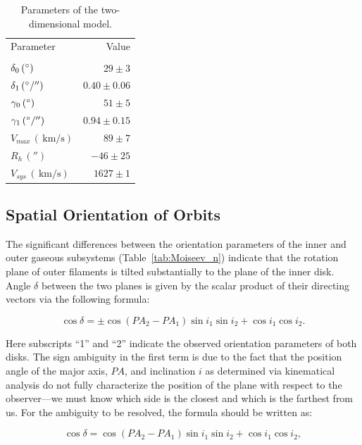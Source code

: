 \documentclass{ab}
\def\degr{\hbox{$^\circ$}}
\newcommand{\km}{\,\mbox{km/s}}
\begin{document}
\begin{table}[tbp]
\caption{Parameters of the two-dimensional model.} \label{tab2:Moiseev_n}
\bigskip
\begin{tabular}{lr}\hline\hline
Parameter& Value\\
         &     \\
\hline
$\delta_0\,(\degr)$    & $29\pm3$\\
$\delta_1\,(\degr/'')$ &$0.40\pm0.06$\\
$\gamma_0\,(\degr)$    &$51\pm5$\\
$\gamma_1\,(\degr/'')$& $0.94\pm0.15$\\
$V_{max}\,(\km)$        & $89\pm7$\\
$R_h\,('')$             & $-46\pm25$\\
$V_{sys}\,(\km)$        & $1627\pm1$\\
\end{tabular}
\end{table}

\subsection{Spatial Orientation of Orbits}

The significant differences between the orientation parameters of
the inner and outer gaseous subsystems (Table~\ref{tab:Moiseev_n})
indicate that the rotation plane of outer filaments is tilted
substantially to the plane of the inner disk. Angle $\delta$
between the two planes is given by the scalar product of their
directing vectors via the following formula:

$$
\cos \delta  =\pm\cos (PA_2-PA_1) \sin i_1 \sin i_2  +\cos i_1 \cos i_2.
$$

Here subscripts ``1'' and ``2'' indicate the observed orientation
parameters of both disks. The sign ambiguity in the first term is
due to the fact that the position angle of the major axis,  $PA$,
and inclination $i$ as determined via kinematical analysis do not
fully characterize the position of the plane with respect to the
observer---we must know which side is the closest and which is the
farthest from us. For the ambiguity to be resolved, the formula
should be written as:

{\small
\begin{equation}
\cos \delta  =\cos (PA_2-PA_1)  \sin i_1 \sin i_2  +\cos i_1 \cos i_2,
\label{eq1:Moiseev_n}
\end{equation}
}
\end{document}
